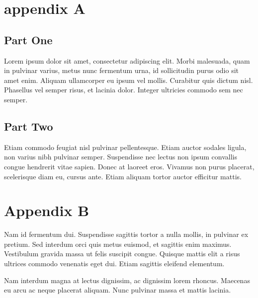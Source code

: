 \documentclass[sigconf]{acmart}
\begin{document}
\section{appendix A}

\subsection{Part One}

Lorem ipsum dolor sit amet, consectetur adipiscing elit. Morbi
malesuada, quam in pulvinar varius, metus nunc fermentum urna, id
sollicitudin purus odio sit amet enim. Aliquam ullamcorper eu ipsum
vel mollis. Curabitur quis dictum nisl. Phasellus vel semper risus, et
lacinia dolor. Integer ultricies commodo sem nec semper.

\subsection{Part Two}

Etiam commodo feugiat nisl pulvinar pellentesque. Etiam auctor sodales
ligula, non varius nibh pulvinar semper. Suspendisse nec lectus non
ipsum convallis congue hendrerit vitae sapien. Donec at laoreet
eros. Vivamus non purus placerat, scelerisque diam eu, cursus
ante. Etiam aliquam tortor auctor efficitur mattis.

\section{Appendix B}

Nam id fermentum dui. Suspendisse sagittis tortor a nulla mollis, in
pulvinar ex pretium. Sed interdum orci quis metus euismod, et sagittis
enim maximus. Vestibulum gravida massa ut felis suscipit
congue. Quisque mattis elit a risus ultrices commodo venenatis eget
dui. Etiam sagittis eleifend elementum.

Nam interdum magna at lectus dignissim, ac dignissim lorem
rhoncus. Maecenas eu arcu ac neque placerat aliquam. Nunc pulvinar
massa et mattis lacinia.
\end{document}
